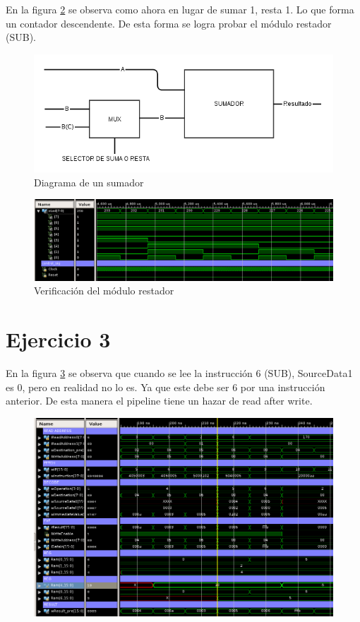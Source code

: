 \documentclass[10pt]{article}
\begin{document}
En la figura \ref{prueba_restador} se observa como ahora en lugar de sumar 1, resta 1. Lo que forma un contador descendente. De esta forma se logra probar el módulo restador (SUB).

\begin{figure}[hbtp]
\centering
\includegraphics[width=1\textwidth]{sumador.png}
\caption{Diagrama de un sumador}
\label{diagrama_sumador}
\end{figure}



\begin{figure}[hbtp]
\centering
\includegraphics[width=1\textwidth]{restador.png}
\caption{Verificación del módulo restador}
\label{prueba_restador}
\end{figure}

\section*{Ejercicio 3}

En la figura \ref{raw_malo} se observa que cuando se lee la instrucción 6 (SUB), SourceData1 es 0, pero en realidad no lo es. Ya que este debe ser 6 por una instrucción anterior. De esta manera el pipeline tiene un hazar de read after write.

\begin{figure}[hbtp]
\centering
\includegraphics[width=1\textwidth]{read-write-malo.png}
\caption{}
\label{raw_malo}
\end{figure}
\end{document}
